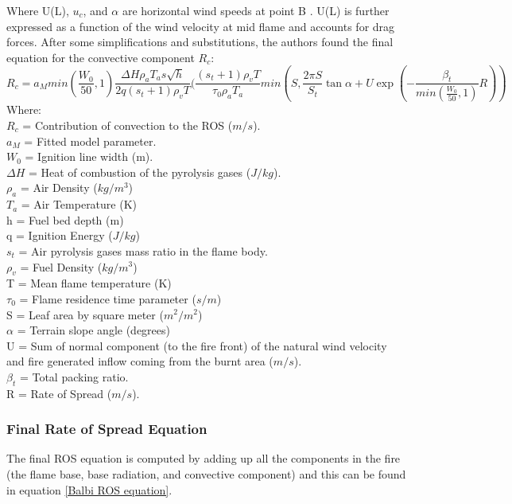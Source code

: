 \documentclass{article}
\begin{document}
Where U(L), $u_c$, and $\alpha$ are horizontal wind speeds at point B \citep{Chatelon2022}. U(L) is further expressed as a function of the wind velocity at mid flame and accounts for drag forces. After some simplifications and substitutions, the authors found the final equation for the convective component $R_c$: \\
\begin{equation}
	\label{convective component}
	R_c = a_M min(\frac {W_0}{50}, 1) \frac {\Delta H \rho _ a T_a s \sqrt{h}}{2q(s_t + 1) \rho _ v T} (\frac {(s_t + 1) \rho _ v T}{\tau _ 0 \rho _ a T_a} min(S, \frac {2 \pi S}{S_t} \tan \alpha + U \exp (- \frac {\beta _ t}{min(\frac{W_0}{50}, 1)} R))
\end{equation}
Where: \\
$R_c$ = Contribution of convection to the ROS ($m/s$).\\
$a_M$ = Fitted model parameter. \\
$W_0$ = Ignition line width (m). \\
$\Delta H$ = Heat of combustion of the pyrolysis gases ($J / kg$). \\
$\rho _ a$ = Air Density ($kg/m^3$) \\
$T_a$ = Air Temperature (K) \\
h = Fuel bed depth (m) \\
q = Ignition Energy ($J / kg$) \\
$s_t$ = Air pyrolysis gases mass ratio in the flame body. \\
$\rho _ v$ = Fuel Density ($kg/m^3$) \\
T = Mean flame temperature (K)\\
$\tau _ 0$ = Flame residence time parameter ($s / m$) \\
S = Leaf area by square meter ($m^ 2 / m^2$) \\
$\alpha$ = Terrain slope angle (degrees)\\
U = Sum of normal component (to the fire front) of the natural wind velocity and fire generated inflow coming from the burnt area ($m / s$). \\
$\beta _ t$ = Total packing ratio. \\
R = Rate of Spread ($m / s$). \\

\subsubsection*{Final Rate of Spread Equation}
\indent The final ROS equation is computed by adding up all the components in the fire (the flame base, base radiation, and convective component) and this can be found in equation \ref{Balbi ROS equation}. 
\end{document}
